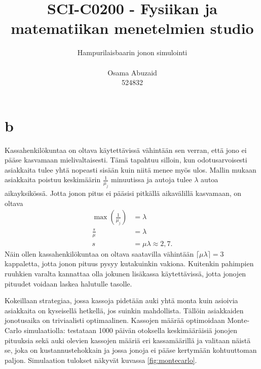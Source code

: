 \documentclass{article}     %
\title{SCI-C0200 - Fysiikan ja matematiikan menetelmien studio}
\date{}
\author{Hampurilaisbaarin jonon simulointi\\ \\ Osama Abuzaid \\ 524832}
\begin{document}
\maketitle
\newpage
\section*{b}
Kassahenkilökuntaa on oltava käytettävissä vähintään sen verran, että jono ei pääse kasvamaan mielivaltaisesti. Tämä tapahtuu silloin, kun odotusarvoisesti asiakkaita tulee yhtä nopeasti sisään kuin niitä menee myös ulos. Mallin mukaan asiakkaita poistuu keskimäärin $\frac{1}{\mu_j}$ minuutissa ja autoja tulee $\lambda$ autoa aikayksikössä. Jotta jonon pitus ei pääsisi pitkällä aikavälillä kasvamaan, on oltava
\begin{align}
\max\left(\frac{1}{\mu_j}\right) &= \lambda \nonumber\\
\frac{s}{\mu} &= \lambda \nonumber\\
s &= \mu \lambda \approx 2,7.
\end{align}
Näin ollen kassahenkilökuntaa on oltava saatavilla vähintään $\lceil \mu \lambda \rceil = 3$ kappaletta, jotta jonon pituus pysyy kutakuinkin vakiona. Kuitenkin pahimpien ruuhkien varalta kannattaa olla jokunen lisäkassa käytettävissä, jotta jonojen pituudet voidaan laskea halutulle tasolle.

Kokeillaan strategiaa, jossa kassoja pidetään auki yhtä monta kuin asioivia asiakkaita on kyseisellä hetkellä, jos suinkin mahdollista. Tällöin asiakkaiden jonotusaika on triviaalisti optimaalinen. Kassojen määrää optimoidaan Monte-Carlo simulaatiolla: testataan 1000 päivän otoksella keskimääräisiä jonojen pituuksia sekä auki olevien kassojen määriä eri kassamäärillä ja valitaan näistä se, joka on kustannustehokkain ja jossa jonoja ei pääse kertymään kohtuuttoman paljon. Simulaation tulokset näkyvät kuvassa \ref{fig:montecarlo}.
\end{document}
